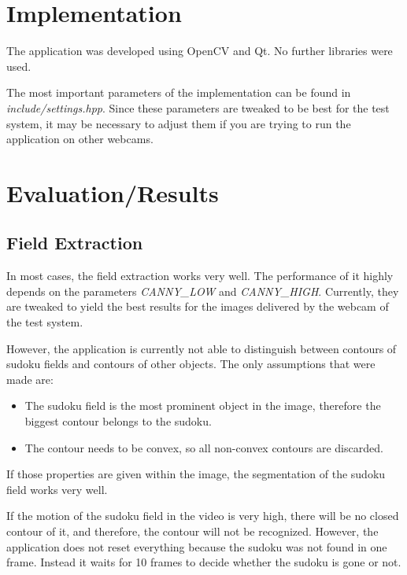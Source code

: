 \documentclass[
a4paper,     %
12pt         %
]{scrartcl}  %
\begin{document}
\section{Implementation}

The application was developed using OpenCV and Qt. No further libraries were used.

The most important parameters of the implementation can be found in \emph{include/settings.hpp}.
Since these parameters are tweaked to be best for the test system, it may be necessary to
adjust them if you are trying to run the application on other webcams. 

\section{Evaluation/Results}
\label{sec:results}

\subsection{Field Extraction}
\label{fieldextraction}

In most cases, the field extraction works very well. The performance of it highly depends on the 
parameters \emph{CANNY\_LOW} and \emph{CANNY\_HIGH}. Currently, they are tweaked to yield the best
results for the images delivered by the webcam of the test system.

However, the application is currently not able to distinguish between contours of sudoku fields and
contours of other objects. The only assumptions that were made are:

\begin{itemize}
  \item The sudoku field is the most prominent object in the image, therefore the biggest contour
  belongs to the sudoku.
  \item The contour needs to be convex, so all non-convex contours are discarded.
\end{itemize}

If those properties are given within the image, the segmentation of the sudoku field works very well. 

If the motion of the sudoku field in the video is very high, there will be no closed contour of it,
and therefore, the contour will not be recognized. However, the application does not reset everything because
the sudoku was not found in one frame. Instead it waits for 10 frames to decide whether the sudoku is gone
or not.
\end{document}
